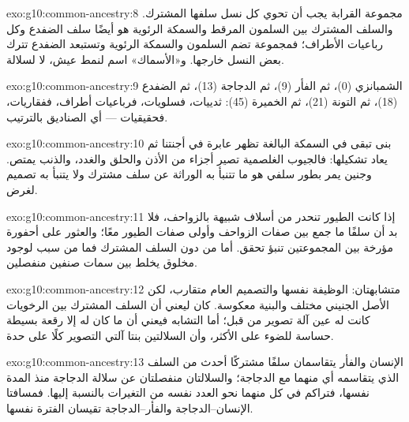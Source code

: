 \begin{solution}{exo:g10:common-ancestry:8}
مجموعة القرابة يجب أن تحوي كل نسل سلفها المشترك. والسلف المشترك بين
السلمون المرقط والسمكة الرئوية هو أيضًا سلف الضفدع وكل رباعيات
الأطراف؛ فمجموعة تضم السلمون والسمكة الرئوية وتستبعد الضفدع تترك بعض
النسل خارجها. و«الأسماك» اسم لنمط عيش، لا لسلالة.
\end{solution}

\begin{solution}{exo:g10:common-ancestry:9}
الشمبانزي (0)، ثم الفأر (9)، ثم الدجاجة (13)، ثم الضفدع (18)، ثم
التونة (21)، ثم الخميرة (45): ثدييات، فسلويات، فرباعيات أطراف،
ففقاريات، فحقيقيات  --- أي الصناديق بالترتيب.
\end{solution}

\begin{solution}{exo:g10:common-ancestry:10}
بنى تبقى في السمكة البالغة تظهر عابرة في أجنتنا ثم يعاد تشكيلها:
فالجيوب الغلصمية تصير أجزاء من الأذن والحلق والغدد، والذنب يمتص. وجنين
يمر بطور سلفي هو ما تتنبأ به الوراثة عن سلف مشترك ولا يتنبأ به تصميم
لغرض.
\end{solution}

\begin{solution}{exo:g10:common-ancestry:11}
إذا كانت الطيور تنحدر من أسلاف شبيهة بالزواحف، فلا بد أن سلفًا ما جمع
بين صفات الزواحف وأولى صفات الطيور معًا؛ والعثور على أحفورة مؤرخة بين
المجموعتين تنبؤ تحقق. أما من دون السلف المشترك فما من سبب لوجود مخلوق
يخلط بين سمات صنفين منفصلين.
\end{solution}

\begin{solution}{exo:g10:common-ancestry:12}
متشابهتان: الوظيفة نفسها والتصميم العام متقارب، لكن الأصل الجنيني
مختلف والبنية معكوسة.  كان ليعني أن السلف المشترك بين الرخويات
 كانت له عين آلة تصوير من قبل؛ أما التشابه فيعني أن ما كان
له إلا رقعة بسيطة حساسة للضوء على الأكثر، وأن السلالتين بنتا آلتي
التصوير كلًا على حدة.
\end{solution}

\begin{solution}{exo:g10:common-ancestry:13}
الإنسان والفأر يتقاسمان سلفًا مشتركًا أحدث من السلف الذي يتقاسمه أي
منهما مع الدجاجة؛ والسلالتان منفصلتان عن سلالة الدجاجة منذ المدة
نفسها، فتراكم في كل منهما نحو العدد نفسه من التغيرات بالنسبة إليها.
فمسافتا الإنسان--الدجاجة والفأر--الدجاجة تقيسان الفترة نفسها.
\end{solution}

